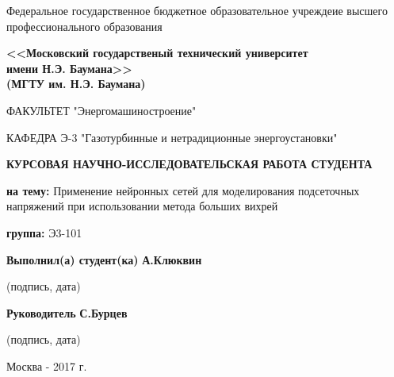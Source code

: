 \documentclass[14pt]{extarticle}
\begin{document}
\begin{titlepage}	%
	\begin{center}
	{ Федеральное государственное бюджетное образовательное учреждеие высшего профессионального образования \\}
	\end{center}


   \begin{minipage}{0.80\textwidth}
		\begin{large}
			\begin{center}
				{
		\textbf{<<Московский государственый технический университет \\ имени Н.Э. Баумана>> \\ (МГТУ им. Н.Э. Баумана) \\}
   				}
			\end{center}
   		\end{large}
	\end{minipage}

   \begin{center}
    \vspace{0.25cm}
	\noindent\makebox[\linewidth]{\rule{\textwidth}{0.4pt}}

    ФАКУЛЬТЕТ "Энергомашиностроение"

    КАФЕДРА Э-3 "Газотурбинные и нетрадиционные энергоустановки"
    \vspace{1cm}


    \begin{large}\textbf{КУРСОВАЯ НАУЧНО-ИССЛЕДОВАТЕЛЬСКАЯ РАБОТА СТУДЕНТА}\end{large}

	\end{center}
    \textbf{на тему:} Применение нейронных сетей для моделирования подсеточных напряжений при использовании метода больших вихрей

    \textbf{группа:} Э3-101

    \begin{small}\textbf{Выполнил(а) студент(ка)} \makebox[9cm]{\hrulefill}  \textbf{А.Клюквин} \\
    \centerline{(подпись, дата)}
    \end{small}

    \begin{small}\textbf{Руководитель} \makebox[11.8cm]{\hrulefill}   \textbf{С.Бурцев} \\
    \centerline{(подпись, дата)}
    \end{small}



\vfill

\begin{center}
  Москва - 2017 г.
\end{center}
\end{titlepage}


%


%
%
%
\end{document}

